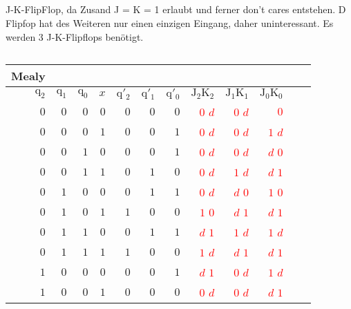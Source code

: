 \documentclass{scrartcl}
\newcommand{\ind}[1]{\ensuremath{\mathrm{#1}}}
\begin{document}
	\subsection{}
	J-K-FlipFlop, da Zusand J = K = 1 erlaubt und ferner don't cares entstehen. D Flipfop hat des Weiteren nur einen einzigen Eingang, daher uninteressant. 
	Es werden 3 J-K-Flipflops benötigt.

	\subsection{}
	\begin{tabular}{*{12}{r}}
	Mealy\\
	\hline
	$\ind{q_2}$ & $\ind{q_1}$ & $\ind{q_0}$ & $x$ & $\ind{q'_2}$ & $\ind{q'_1}$ &$\ind{q'_0}$ & $\ind{J_2}$$\ind{K_2}$ & $\ind{J_1}$$\ind{K_1}$ & $\ind{J_0}$$\ind{K_0}$\\	
	\hline
	$0$& $0$ & $0$ & $0$ & $0$ & $0$ & $0$ & \textcolor{red}{$0$} \textcolor{red}{$d$} & \textcolor{red}{$0$} \textcolor{red}{$d$} & \textcolor{red}{$0$} \textbf{{\color{red}{$d$}}}\\%
	$0$& $0$ & $0$ & $1$ & $0$ & $0$ & $1$ & \textcolor{red}{$0$} \textcolor{red}{$d$} & \textcolor{red}{$0$} \textcolor{red}{$d$} & \textcolor{red}{$1$} \textcolor{red}{$d$}\\%
	$0$& $0$ & $1$ & $0$ & $0$ & $0$ & $1$ & \textcolor{red}{$0$} \textcolor{red}{$d$} & \textcolor{red}{$0$} \textcolor{red}{$d$} & \textcolor{red}{$d$} \textcolor{red}{$0$}\\%
	$0$& $0$ & $1$ & $1$ & $0$ & $1$ & $0$ & \textcolor{red}{$0$} \textcolor{red}{$d$} & \textcolor{red}{$1$} \textcolor{red}{$d$} & \textcolor{red}{$d$} \textcolor{red}{$1$}\\%
	$0$& $1$ & $0$ & $0$ & $0$ & $1$ & $1$ & \textcolor{red}{$0$} \textcolor{red}{$d$} & \textcolor{red}{$d$} \textcolor{red}{$0$} & \textcolor{red}{$1$} \textcolor{red}{$0$}\\%
	$0$& $1$ & $0$ & $1$ & $1$ & $0$ & $0$ & \textcolor{red}{$1$} \textcolor{red}{$0$} & \textcolor{red}{$d$} \textcolor{red}{$1$} & \textcolor{red}{$d$} \textcolor{red}{$1$}\\%
	$0$& $1$ & $1$ & $0$ & $0$ & $1$ & $1$ & \textcolor{red}{$d$} \textcolor{red}{$1$} & \textcolor{red}{$1$} \textcolor{red}{$d$} & \textcolor{red}{$1$} \textcolor{red}{$d$}\\%
	$0$& $1$ & $1$ & $1$ & $1$ & $0$ & $0$ & \textcolor{red}{$1$} \textcolor{red}{$d$} & \textcolor{red}{$d$} \textcolor{red}{$1$} & \textcolor{red}{$d$} \textcolor{red}{$1$}\\%
	$1$& $0$ & $0$ & $0$ & $0$ & $0$ & $1$ & \textcolor{red}{$d$} \textcolor{red}{$1$} & \textcolor{red}{$0$} \textcolor{red}{$d$} & \textcolor{red}{$1$} \textcolor{red}{$d$}\\
	$1$& $0$ & $0$ & $1$ & $0$ & $0$ & $0$ & \textcolor{red}{$0$} \textcolor{red}{$d$} & \textcolor{red}{$0$} \textcolor{red}{$d$} & \textcolor{red}{$d$} \textcolor{red}{$1$}\\
	\hline									
	\end{tabular}
\end{document}

